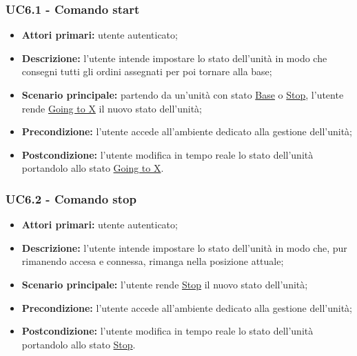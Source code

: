         \subsubsection{UC6.1 - Comando start}
        \begin{itemize}
            \item \textbf{Attori primari:} utente autenticato;
            \item \textbf{Descrizione:} l'utente intende impostare lo stato dell'unità in modo che consegni tutti gli ordini assegnati per poi tornare alla base;
            \item \textbf{Scenario principale:} partendo da un'unità con stato \underline{Base} o \underline{Stop}, l'utente rende \underline{Going to X} il nuovo stato dell'unità;
            \item \textbf{Precondizione:} l'utente accede all'ambiente dedicato alla gestione dell'unità;
            \item \textbf{Postcondizione:} l'utente modifica in tempo reale lo stato dell'unità portandolo allo stato \underline{Going to X}.
        \end{itemize}

        \subsubsection{UC6.2 - Comando stop}
        \begin{itemize}
            \item \textbf{Attori primari:} utente autenticato;
            \item \textbf{Descrizione:} l'utente intende impostare lo stato dell'unità in modo che, pur rimanendo accesa e connessa, rimanga nella posizione attuale;
            \item \textbf{Scenario principale:} l'utente rende \underline{Stop} il nuovo stato dell'unità;
            \item \textbf{Precondizione:} l'utente accede all'ambiente dedicato alla gestione dell'unità;
            \item \textbf{Postcondizione:} l'utente modifica in tempo reale lo stato dell'unità portandolo allo stato \underline{Stop}.
        \end{itemize}

